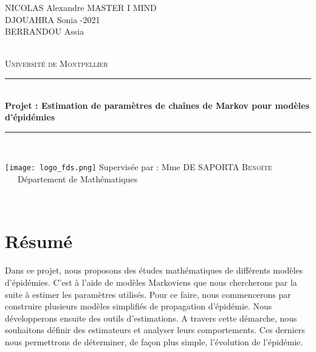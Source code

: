 \documentclass[12pt,a4paper]{report}
\newcommand{\HRule}{\rule{\linewidth}{0.5mm}}
\theoremstyle{remark}
\begin{document}
\begin{titlepage}
  \begin{sffamily}  
      \flushleft NICOLAS Alexandre \qquad \qquad \qquad \qquad \qquad\qquad \qquad \qquad  \qquad\qquad \qquad \qquad \qquad  MASTER I MIND
      \\DJOUAHRA Sonia \qquad \qquad \qquad    \qquad \qquad \qquad \qquad \qquad \qquad \qquad \qquad \qquad \qquad \qquad {}-2021
      \\BERRANDOU Assia 

  \begin{center}
 \textsc{}\\[4cm]
    \textsc{\LARGE Université de Montpellier}\\[2cm]
    \HRule \\[0.4cm]
    { \huge \bfseries Projet : Estimation de paramètres de chaînes de Markov pour modèles d'épidémies\\[0.4cm] }
    \HRule \\[2cm]
    \vspace{4cm}
    \begin{minipage}{1\textwidth}
      \begin{flushleft}
       \texttt{[image: logo\_fds.png]}
       \qquad \qquad\qquad\qquad\qquad\qquad\qquad Supervisée par : Mme DE SAPORTA \textsc{Benoîte}\\
       \qquad\qquad\qquad\qquad\qquad\qquad\qquad\qquad\qquad \qquad\qquad \qquad\qquad\qquad\ \ \  Département de Mathématiques
       \end{flushleft}
    \end{minipage}
     \textsc{}\\[1.2cm]
    \vfill
  \end{center}
  \end{sffamily}
\end{titlepage}

\newpage
\section*{Résumé}
\vspace{0.6cm}

Dans ce projet, nous proposons des études mathématiques de différents modèles d'épidémies. C'est à l'aide de modèles Markoviens que nous chercherons par la suite à estimer les paramètres utilisés. Pour ce faire, nous commencerons par construire plusieurs modèles simplifiés de propagation d'épidémie. Nous développerons ensuite des outils d'estimations. A travers cette démarche, nous souhaitons définir des estimateurs et analyser leurs comportements. Ces derniers nous permettrons de déterminer, de façon plus simple, l'évolution de l'épidémie.  
\end{document}
